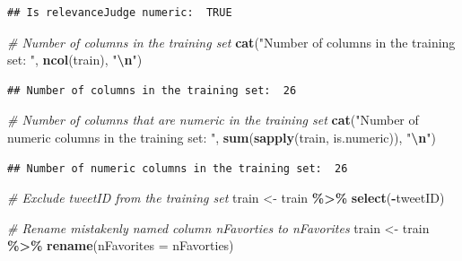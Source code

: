 \documentclass[
]{article}
\newenvironment{Shaded}{\begin{snugshade}}{\end{snugshade}}
\newcommand{\AttributeTok}[1]{\textcolor[rgb]{0.13,0.29,0.53}{#1}}
\newcommand{\CommentTok}[1]{\textcolor[rgb]{0.56,0.35,0.01}{\textit{#1}}}
\newcommand{\FunctionTok}[1]{\textcolor[rgb]{0.13,0.29,0.53}{\textbf{#1}}}
\newcommand{\NormalTok}[1]{#1}
\newcommand{\OtherTok}[1]{\textcolor[rgb]{0.56,0.35,0.01}{#1}}
\newcommand{\SpecialCharTok}[1]{\textcolor[rgb]{0.81,0.36,0.00}{\textbf{#1}}}
\newcommand{\StringTok}[1]{\textcolor[rgb]{0.31,0.60,0.02}{#1}}
\begin{document}
\begin{Shaded}
\end{Shaded}

\begin{verbatim}
## Is relevanceJudge numeric:  TRUE
\end{verbatim}

\begin{Shaded}
\begin{Highlighting}[]
\CommentTok{\# Number of columns in the training set}
\FunctionTok{cat}\NormalTok{(}\StringTok{"Number of columns in the training set: "}\NormalTok{, }
    \FunctionTok{ncol}\NormalTok{(train), }\StringTok{"}\SpecialCharTok{\textbackslash{}n}\StringTok{"}\NormalTok{)}
\end{Highlighting}
\end{Shaded}

\begin{verbatim}
## Number of columns in the training set:  26
\end{verbatim}

\begin{Shaded}
\begin{Highlighting}[]
\CommentTok{\# Number of columns that are numeric in the training set}
\FunctionTok{cat}\NormalTok{(}\StringTok{"Number of numeric columns in the training set: "}\NormalTok{, }
    \FunctionTok{sum}\NormalTok{(}\FunctionTok{sapply}\NormalTok{(train, is.numeric)), }\StringTok{"}\SpecialCharTok{\textbackslash{}n}\StringTok{"}\NormalTok{)}
\end{Highlighting}
\end{Shaded}

\begin{verbatim}
## Number of numeric columns in the training set:  26
\end{verbatim}

\begin{Shaded}
\begin{Highlighting}[]
\CommentTok{\# Exclude tweetID from the training set}
\NormalTok{train }\OtherTok{\textless{}{-}}\NormalTok{ train }\SpecialCharTok{\%\textgreater{}\%}
  \FunctionTok{select}\NormalTok{(}\SpecialCharTok{{-}}\NormalTok{tweetID)}

\CommentTok{\# Rename mistakenly named column nFavorties to nFavorites}
\NormalTok{train }\OtherTok{\textless{}{-}}\NormalTok{ train }\SpecialCharTok{\%\textgreater{}\%}
  \FunctionTok{rename}\NormalTok{(}\AttributeTok{nFavorites =}\NormalTok{ nFavorties)}
\end{Highlighting}
\end{Shaded}
\end{document}
